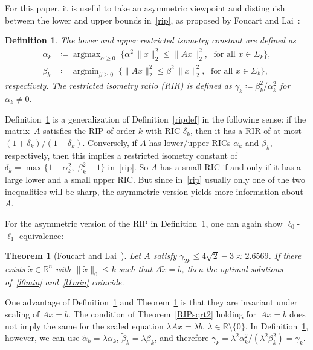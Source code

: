 \documentclass[journal]{IEEEtran}
\newtheorem{theorem}{Theorem}
\newtheorem{definition}{Definition}
\DeclareMathOperator*{\argmin}{argmin}
\DeclareMathOperator*{\argmax}{argmax}
\newcommand{\define}{\coloneqq}
\newcommand{\Norm}[2]{\lVert{#1}\rVert_{#2}}
\newcommand{\R}{\mathds{R}}
\begin{document}
For this paper, it is useful to take an asymmetric viewpoint and
distinguish between the lower and upper bounds in~\eqref{rip}, as proposed
by Foucart and Lai~\cite{FL09}:

\begin{definition}\label{asymRIPdef}
 The \emph{lower} and \emph{upper restricted isometry constant} are defined as
 \begin{align}
   \alpha_k & \define \argmax_{\alpha \geq 0}\; \big\{ \alpha^2\, \Norm{x}{2}^2
   \leq \Norm{Ax}{2}^2,\; \text{ for all }x \in \Sigma_k\big\}, \label{lowerRIP}\\
   \beta_k & \define \argmin_{\beta \geq 0}\; \big\{ \Norm{Ax}{2}^2 \leq \beta^2\,
   \Norm{x}{2}^2,\; \text{ for all }x \in \Sigma_k\big\},\label{upperRIP}
 \end{align}
 respectively. The \emph{restricted isometry ratio} (RIR) is
 defined as $\gamma_k \define \beta_k^2 / \alpha_k^2$ for $\alpha_k \neq 0$.
\end{definition}

Definition~\ref{asymRIPdef} is a generalization of Definition~\ref{ripdef}
in the following sense: if the matrix~$A$ satisfies the RIP of order $k$
with RIC $\delta_k$, then it has a RIR of at most $(1 + \delta_k) / (1 -
\delta_k)$. Conversely, if $A$ has lower/upper RICs $\alpha_k$ and
$\beta_k$, respectively, then this implies a restricted isometry constant
of $\delta_k = \max \{1 - \alpha_k^2,\; \beta_k^2 - 1\}$ in~\eqref{rip}.
So $A$ has a small RIC if and only if it has a large lower and a small upper 
RIC. But since in~\eqref{rip} usually only one of the two inequalities will 
be sharp, the asymmetric version yields more information about~$A$.

For the asymmetric version of the RIP in Definition~\ref{asymRIPdef}, one
can again show $\ell_0$-$\ell_1$-equivalence:

\begin{theorem}[Foucart and Lai~\cite{FL09}]\label{asymRIPtheorem}
  Let $A$ satisfy $\gamma_{2k} \leq 4 \sqrt{2} - 3 \approx 2.6569$. If
  there exists $\tilde{x} \in \R^n$ with $\Norm{\tilde{x}}{0} \leq k$ such
  that $A\tilde{x} = b$, then the optimal solutions of~\eqref{l0min}
  and~\eqref{l1min} coincide.
\end{theorem}

One advantage
of Definition~\ref{asymRIPdef} and Theorem~\ref{asymRIPtheorem} is that they
are invariant under scaling of $Ax = b$. The condition of
Theorem~\ref{RIPsqrt2} holding for~$A x = b$ does not imply the same 
for the scaled equation
$\lambda Ax = \lambda b$, $\lambda \in \R \setminus \{0\}$. In Definition~\ref{asymRIPdef}, however, we can
use $\tilde{\alpha}_k = \lambda \alpha_k$, $\tilde{\beta}_k = \lambda
\beta_k$, and therefore $\tilde{\gamma}_k = \lambda^2 \alpha_k^2 /
(\lambda^2 \beta_k^2) = \gamma_k$.
\end{document}
